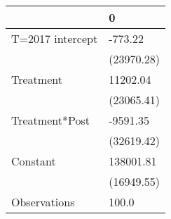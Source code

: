 \begin{tabular}{ll}
\toprule
{} &           0 \\
\midrule
T=2017 intercept &     -773.22 \\
                 &  (23970.28) \\
Treatment        &    11202.04 \\
                 &  (23065.41) \\
Treatment*Post   &    -9591.35 \\
                 &  (32619.42) \\
Constant         &   138001.81 \\
                 &  (16949.55) \\
Observations     &       100.0 \\
\bottomrule
\end{tabular}

